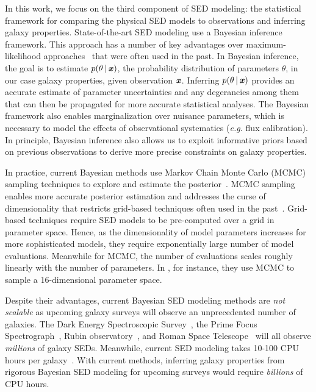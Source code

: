 In this work, we focus on the third component of SED modeling: the statistical
framework for comparing the physical SED models to observations and inferring
galaxy properties. 
State-of-the-art SED modeling use a Bayesian inference framework.
This approach has a number of key advantages over maximum-likelihood 
approaches~\citep[\emph{e.g.}][]{cidfernandes2005, tojeiro2007, koleva2008} 
that were often used in the past.
In Bayesian inference, the goal is to estimate $p(\theta\,|\,\textbf{\textit{x}})$, the
probability distribution of parameters $\theta$, in our case galaxy
properties, given observation $\textbf{\textit{x}}$. 
Inferring $p(\theta\,|\,\textbf{\textit{x}})$ provides an accurate estimate of parameter 
uncertainties and any degerancies among them that can then be propagated for
more accurate statistical analyses. 
The Bayesian framework also enables marginalization over nuisance parameters,
which is necessary to model the effects of observational systematics
(\emph{e.g.} flux calibration).
In principle, Bayesian inference also allows us to exploit informative priors
based on previous observations to derive more precise constraints on galaxy
properties. 

In practice, current Bayesian methods use Markov Chain Monte Carlo (MCMC) 
sampling techniques to explore and estimate the posterior~\citep{acquaviva2011,
chevallard2016, leja2017, carnall2018}. 
MCMC sampling enables more accurate posterior estimation and addresses the
curse of dimensionality that restricts grid-based techniques often used in the
past~\citep{kauffmann2003a, burgarella2005, salim2007, dacunha2008}.
Grid-based techniques require SED models to be pre-computed over a grid in
parameter space.
Hence, as the dimensionality of model parameters increases for more
sophisticated models, they require exponentially large number of model
evaluations.
Meanwhile for MCMC, the number of evaluations scales roughly linearly with the
number of parameters.  
In \cite{johnson2021}, for instance, they use MCMC to sample a 16-dimensional
parameter space. 

Despite their advantages, current Bayesian SED modeling methods are \emph{not
scalable} as upcoming galaxy surveys will observe an unprecedented number of
galaxies.
The Dark Energy Spectroscopic Survey~\citep[DESI;][]{desicollaboration2016},
the Prime Focus Spectrograph~\citep[PFS;][]{takada2014},
Rubin observatory~\citep{ivezic2019}, and Roman Space
Telescope~\citep{spergel2015} will all observe \emph{millions} of galaxy SEDs. 
Meanwhile, current SED modeling takes 10-100 CPU hours per
galaxy~\citep[\emph{e.g.}][]{carnall2019a, tacchella2021}.
With current methods, inferring galaxy properties from rigorous Bayesian SED
modeling for upcoming surveys  would require \emph{billions} of CPU hours. 

